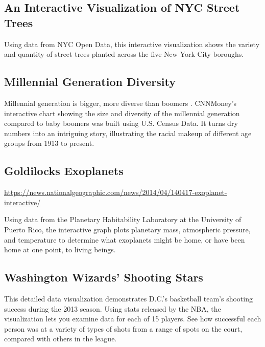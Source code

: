 \documentclass[]{book}
\theoremstyle{definition}
\theoremstyle{definition}
\theoremstyle{definition}
\theoremstyle{remark}
\begin{document}
\subsection{An Interactive Visualization of NYC Street
Trees}\label{an-interactive-visualization-of-nyc-street-trees}

\citep{trees} Using data from NYC Open Data, this interactive
visualization shows the variety and quantity of street trees planted
across the five New York City boroughs.

\subsection{Millennial Generation
Diversity}\label{millennial-generation-diversity}

Millennial generation is bigger, more diverse than boomers
\citep{age_groups}. CNNMoney's interactive chart showing the size and
diversity of the millennial generation compared to baby boomers was
built using U.S. Census Data. It turns dry numbers into an intriguing
story, illustrating the racial makeup of different age groups from 1913
to present.

\subsection{Goldilocks Exoplanets}\label{goldilocks-exoplanets}

\url{https://news.nationalgeographic.com/news/2014/04/140417-exoplanet-interactive/}

Using data from the Planetary Habitability Laboratory at the University
of Puerto Rico, the interactive graph plots planetary mass, atmospheric
pressure, and temperature to determine what exoplanets might be home, or
have been home at one point, to living beings.

\subsection{Washington Wizards' Shooting
Stars}\label{washington-wizards-shooting-stars}

\citep{basketball}

This detailed data visualization demonstrates D.C.'s basketball team's
shooting success during the 2013 season. Using stats released by the
NBA, the visualization lets you examine data for each of 15 players. See
how successful each person was at a variety of types of shots from a
range of spots on the court, compared with others in the league.
\end{document}
